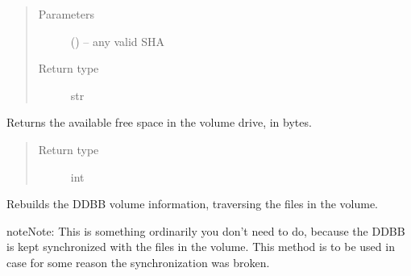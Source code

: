\documentclass[letterpaper,10pt,english]{sphinxmanual}
\begin{document}
\begin{fulllineitems}
\begin{fulllineitems}
\begin{quote}
\end{quote}
\begin{quote}\begin{description}
\item[{Parameters}] \leavevmode
{} () -- any valid SHA

\item[{Return type}] \leavevmode
str

\end{description}\end{quote}

\end{fulllineitems}


\begin{fulllineitems}
\label{\detokenize{index:fsbackup.hashVolume.HashVolume.getAvailableSpace}}
Returns the available free space in the volume drive, in bytes.
\begin{quote}\begin{description}
\item[{Return type}] \leavevmode
int

\end{description}\end{quote}

\end{fulllineitems}


\begin{fulllineitems}
\label{\detokenize{index:fsbackup.hashVolume.HashVolume.recalculateContainer}}
Rebuilds the DDBB volume information, traversing the files in the volume.

\begin{sphinxadmonition}{note}{Note:}
This is something ordinarily you don't need to do, because the DDBB
is kept synchronized with the files in the volume. This method is to be used
in case for some reason the synchronization was broken.
\end{sphinxadmonition}

\end{fulllineitems}


\end{fulllineitems}
\end{document}
